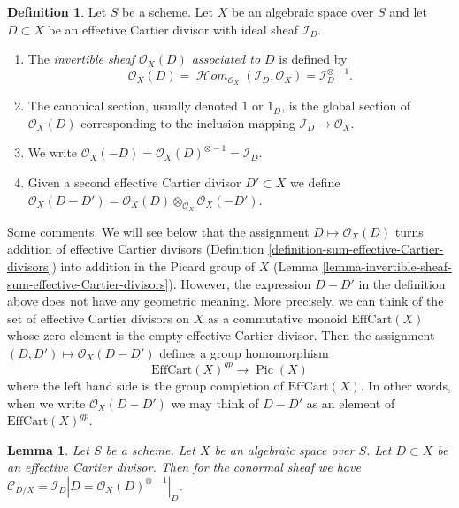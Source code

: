 \documentclass{stacks-project}
\theoremstyle{plain}
\newtheorem{lemma}[subsection]{Lemma}
\theoremstyle{definition}
\newtheorem{definition}[subsection]{Definition}
\theoremstyle{remark}
\numberwithin{equation}{subsection}
\def\SheafHom{\mathop{\mathcal{H}\!\mathit{om}}\nolimits}
\def\Pic{\mathop{\mathrm{Pic}}\nolimits}
\begin{document}
\begin{definition}
\label{definition-invertible-sheaf-effective-Cartier-divisor}
Let $S$ be a scheme. Let $X$ be an algebraic space over $S$
and let $D \subset X$ be an effective Cartier divisor with ideal
sheaf $\mathcal{I}_D$.
\begin{enumerate}
\item The {\it invertible sheaf $\mathcal{O}_X(D)$ associated to $D$}
is defined by
$$
\mathcal{O}_X(D) =
\SheafHom_{\mathcal{O}_X}(\mathcal{I}_D, \mathcal{O}_X) =
\mathcal{I}_D^{\otimes -1}.
$$
\item The canonical section, usually denoted $1$ or $1_D$, is the
global section of $\mathcal{O}_X(D)$ corresponding to
the inclusion mapping $\mathcal{I}_D \to \mathcal{O}_X$.
\item We write
$\mathcal{O}_X(-D) = \mathcal{O}_X(D)^{\otimes -1} = \mathcal{I}_D$.
\item Given a second effective Cartier divisor $D' \subset X$ we define
$\mathcal{O}_X(D - D') =
\mathcal{O}_X(D) \otimes_{\mathcal{O}_X} \mathcal{O}_X(-D')$.
\end{enumerate}
\end{definition}

\noindent
Some comments. We will see below that the assignment
$D \mapsto \mathcal{O}_X(D)$ turns addition of effective Cartier
divisors (Definition \ref{definition-sum-effective-Cartier-divisors})
into addition in the Picard group of $X$
(Lemma \ref{lemma-invertible-sheaf-sum-effective-Cartier-divisors}).
However, the expression $D - D'$ in the definition above does not
have any geometric meaning. More precisely, we can think of the
set of effective Cartier divisors on $X$ as a commutative monoid
$\text{EffCart}(X)$ whose zero element is the empty effective Cartier divisor.
Then the assignment $(D, D') \mapsto \mathcal{O}_X(D - D')$ defines
a group homomorphism
$$
\text{EffCart}(X)^{gp} \longrightarrow \Pic(X)
$$
where the left hand side is the group completion of
$\text{EffCart}(X)$. In other words, when we write $\mathcal{O}_X(D - D')$
we may think of $D - D'$ as an element of $\text{EffCart}(X)^{gp}$.

\begin{lemma}
\label{lemma-conormal-effective-Cartier-divisor}
Let $S$ be a scheme. Let $X$ be an algebraic space over $S$.
Let $D \subset X$ be an effective Cartier divisor.
Then for the conormal sheaf we have $\mathcal{C}_{D/X} = \mathcal{I}_D|D =
\mathcal{O}_X(D)^{\otimes -1}|_D$.
\end{lemma}
\end{document}
